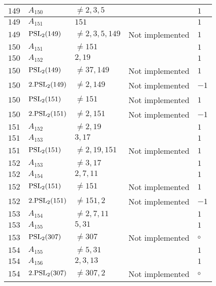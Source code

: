 \documentclass[a4paper, 11pt]{article}
\begin{document}
\begin{longtable}{lllll}
        $ 149 $ & $ A_{150} $ & $ \neq 2, 3, 5 $ & $ ~ $ & $ 1  $ \\ \hline
        $ 149 $ & $ A_{151} $ & $ 151 $ & $ ~ $ & $ 1  $ \\ \hline
        $ 149 $ & $ {\rm PSL}_{2}(149) $ & $ \neq 2, 3, 5, 149 $ & Not implemented & $ 1  $ \\ \hline
        $ 150 $ & $ A_{151} $ & $ \neq 151 $ & $ ~ $ & $ 1  $ \\ \hline
        $ 150 $ & $ A_{152} $ & $ 2, 19 $ & $ ~ $ & $ 1  $ \\ \hline
        $ 150 $ & $ {\rm PSL}_{2}(149) $ & $ \neq 37, 149 $ & Not implemented & $ 1  $ \\ \hline
        $ 150 $ & $ 2.{\rm PSL}_{2}(149) $ & $ \neq 2, 149 $ & Not implemented & $ -1  $ \\ \hline
        $ 150 $ & $ {\rm PSL}_{2}(151) $ & $ \neq 151 $ & Not implemented & $ 1  $ \\ \hline
        $ 150 $ & $ 2.{\rm PSL}_{2}(151) $ & $ \neq 2, 151 $ & Not implemented & $ -1  $ \\ \hline
        $ 151 $ & $ A_{152} $ & $ \neq 2, 19 $ & $ ~ $ & $ 1  $ \\ \hline
        $ 151 $ & $ A_{153} $ & $ 3, 17 $ & $ ~ $ & $ 1  $ \\ \hline
        $ 151 $ & $ {\rm PSL}_{2}(151) $ & $ \neq 2, 19, 151 $ & Not implemented & $ 1  $ \\ \hline
        $ 152 $ & $ A_{153} $ & $ \neq 3, 17 $ & $ ~ $ & $ 1  $ \\ \hline
        $ 152 $ & $ A_{154} $ & $ 2, 7, 11 $ & $ ~ $ & $ 1  $ \\ \hline
        $ 152 $ & $ {\rm PSL}_{2}(151) $ & $ \neq 151 $ & Not implemented & $ 1  $ \\ \hline
        $ 152 $ & $ 2.{\rm PSL}_{2}(151) $ & $ \neq 151, 2 $ & Not implemented & $ -1  $ \\ \hline
        $ 153 $ & $ A_{154} $ & $ \neq 2, 7, 11 $ & $ ~ $ & $ 1  $ \\ \hline
        $ 153 $ & $ A_{155} $ & $ 5, 31 $ & $ ~ $ & $ 1  $ \\ \hline
        $ 153 $ & $ {\rm PSL}_{2}(307) $ & $ \neq 307 $ & Not implemented & $\circ$ \\ \hline
        $ 154 $ & $ A_{155} $ & $ \neq 5, 31 $ & $ ~ $ & $ 1  $ \\ \hline
        $ 154 $ & $ A_{156} $ & $ 2, 3, 13 $ & $ ~ $ & $ 1  $ \\ \hline
        $ 154 $ & $ 2.{\rm PSL}_{2}(307) $ & $ \neq 307, 2 $ & Not implemented & $\circ$ \\ \hline

\end{longtable}
\end{document}
